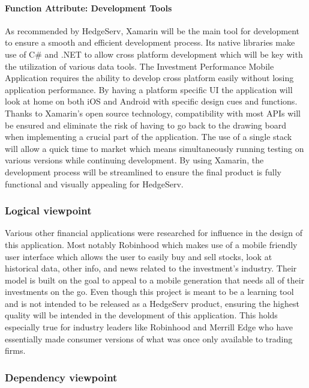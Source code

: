 \documentclass[onecolumn, draftclsnofoot,10pt, compsoc]{IEEEtran}
\begin{document}
\paragraph{Function Attribute: Development Tools}
    As recommended by HedgeServ, Xamarin will be the main tool for development to ensure a smooth and efficient development process. Its native libraries make use of C\# and .NET to allow cross platform
    development which will be key with the utilization of various data tools. The Investment Performance Mobile Application requires the ability to develop cross platform easily without losing 
    application performance. By having a platform specific UI the application will look at home on both iOS and Android with specific design cues and functions. Thanks to Xamarin's open source technology,
    compatibility with most APIs will be ensured and eliminate the risk of having to go back to the drawing board when implementing a crucial part of the application. The use of a single stack will allow 
    a quick time to market which means simultaneously running testing on various versions while continuing development. By using Xamarin, the development process will be streamlined to ensure the final product
    is fully functional and visually appealing for HedgeServ. 


\subsubsection{Logical viewpoint}
        Various other financial applications were researched for influence in the design of this application. Most notably Robinhood which makes use of a mobile friendly user interface which allows the user to
	easily buy and sell stocks, look at historical data, other info, and news related to the investment's industry. Their model is built on the goal to appeal to a mobile generation that needs all of their
	investments on the go. Even though this project is meant to be a learning tool and is not intended to be released as a HedgeServ product, ensuring the highest quality will be intended in the development
	of this application. This holds especially true for industry leaders like Robinhood and Merrill Edge who have essentially made consumer versions of what was once only available to trading firms. 
     
\subsubsection{Dependency viewpoint}
\end{document}
